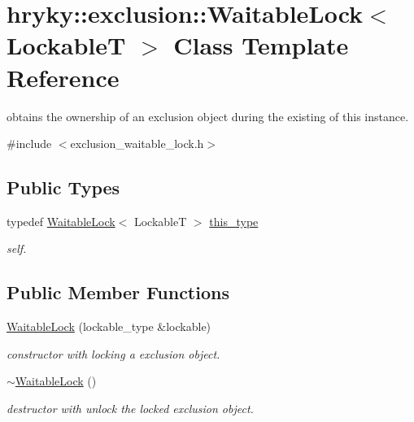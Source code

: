 \hypertarget{classhryky_1_1exclusion_1_1_waitable_lock}{\section{hryky\-:\-:exclusion\-:\-:Waitable\-Lock$<$ Lockable\-T $>$ Class Template Reference}
\label{classhryky_1_1exclusion_1_1_waitable_lock}
}


obtains the ownership of an exclusion object during the existing of this instance.  




{\ttfamily \#include $<$exclusion\-\_\-waitable\-\_\-lock.\-h$>$}

\subsection*{Public Types}
\begin{DoxyCompactItemize}
\item 
\hypertarget{classhryky_1_1exclusion_1_1_waitable_lock_ac04c20cbf4a51c9dac3ae485ff40c723}{typedef \hyperlink{classhryky_1_1exclusion_1_1_waitable_lock}{Waitable\-Lock}$<$ Lockable\-T $>$ \hyperlink{classhryky_1_1exclusion_1_1_waitable_lock_ac04c20cbf4a51c9dac3ae485ff40c723}{this\-\_\-type}}\label{classhryky_1_1exclusion_1_1_waitable_lock_ac04c20cbf4a51c9dac3ae485ff40c723}

\begin{DoxyCompactList}\small\item\em self. \end{DoxyCompactList}\end{DoxyCompactItemize}
\subsection*{Public Member Functions}
\begin{DoxyCompactItemize}
\item 
\hypertarget{classhryky_1_1exclusion_1_1_waitable_lock_a57940b01639eedd771e6eabc709c633c}{\hyperlink{classhryky_1_1exclusion_1_1_waitable_lock_a57940b01639eedd771e6eabc709c633c}{Waitable\-Lock} (lockable\-\_\-type \&lockable)}\label{classhryky_1_1exclusion_1_1_waitable_lock_a57940b01639eedd771e6eabc709c633c}

\begin{DoxyCompactList}\small\item\em constructor with locking a exclusion object. \end{DoxyCompactList}\item 
\hypertarget{classhryky_1_1exclusion_1_1_waitable_lock_ab2038d9f27a781b2f3255fed935100f7}{\hyperlink{classhryky_1_1exclusion_1_1_waitable_lock_ab2038d9f27a781b2f3255fed935100f7}{$\sim$\-Waitable\-Lock} ()}\label{classhryky_1_1exclusion_1_1_waitable_lock_ab2038d9f27a781b2f3255fed935100f7}

\begin{DoxyCompactList}\small\item\em destructor with unlock the locked exclusion object. \end{DoxyCompactList}\end{DoxyCompactItemize}
